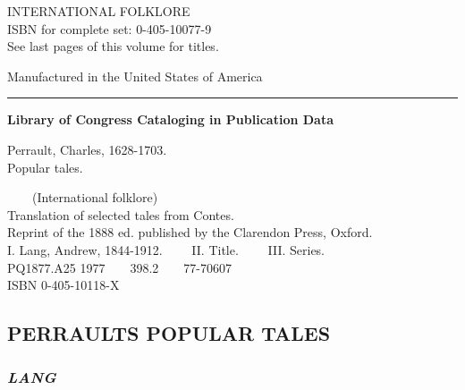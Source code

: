 \documentclass[14pt,a4paper]{memoir}
\begin{document}
INTERNATIONAL FOLKLORE\\
ISBN for complete set: 0-405-10077-9\\
See last pages of this volume for titles.

Manufactured in the United States of America

\begin{center}\rule{0.5\linewidth}{0.5pt}\end{center}

\textbf{Library of Congress Cataloging in Publication Data}

Perrault, Charles, 1628-1703.\\
\hspace*{0.333em}\hspace*{0.333em}\hspace*{0.333em}\hspace*{0.333em}Popular
tales.

~~~~(International folklore)\\
\hspace*{0.333em}\hspace*{0.333em}\hspace*{0.333em}\hspace*{0.333em}Translation
of selected tales from Contes.\\
\hspace*{0.333em}\hspace*{0.333em}\hspace*{0.333em}\hspace*{0.333em}Reprint
of the 1888 ed. published by the Clarendon Press, Oxford.\\
\hspace*{0.333em}\hspace*{0.333em}\hspace*{0.333em}\hspace*{0.333em}I.
Lang, Andrew, 1844-1912.~~~~ II. Title.~~~~ III. Series.\\
PQ1877.A25 1977~~~~398.2~~~~77-70607\\
ISBN 0-405-10118-X

\subsection{PERRAULT\textquotesingle S POPULAR TALES}

\hypertarget{4533318093929944247_33931-h-0.htm.xhtmlux5cux23pgepubid00006}{%
\subsubsection{\texorpdfstring{\emph{LANG}}{LANG}}\label{4533318093929944247_33931-h-0.htm.xhtmlux5cux23pgepubid00006}}
\end{document}
